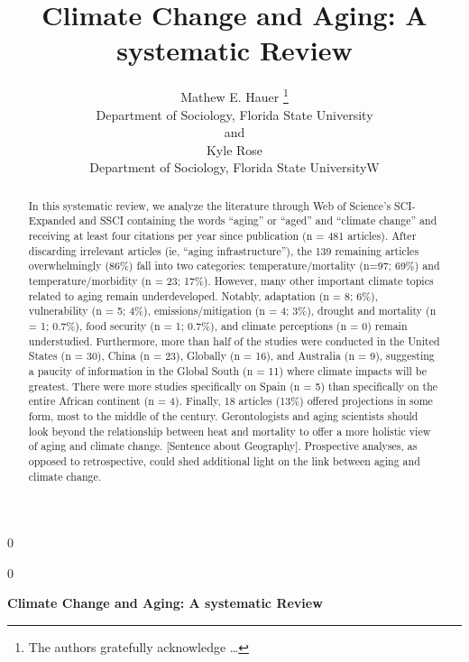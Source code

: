 \documentclass[12pt]{article}
\newcommand{\blind}{0}
\begin{document}
\def\spacingset#1{\renewcommand{\baselinestretch}%
{#1}\small\normalsize} \spacingset{1}



\blind
{
  \title{\bf Climate Change and Aging: A systematic Review}

  \author{
        Mathew E. Hauer \thanks{The authors gratefully acknowledge
\ldots{}} \\
    Department of Sociology, Florida State University\\
     and \\     Kyle Rose \\
    Department of Sociology, Florida State UniversityW\\
      }
  \maketitle
} \fi

\blind
{
  \bigskip
  \bigskip
  \bigskip
  \begin{center}
    {\LARGE\bf Climate Change and Aging: A systematic Review}
  \end{center}
  \medskip
} \fi

\bigskip
\begin{abstract}
In this systematic review, we analyze the literature through Web of
Science's SCI-Expanded and SSCI containing the words ``aging'' or
``aged'' and ``climate change'' and receiving at least four citations
per year since publication (n = 481 articles). After discarding
irrelevant articles (ie, ``aging infrastructure''), the 139 remaining
articles overwhelmingly (86\%) fall into two categories:
temperature/mortality (n=97; 69\%) and temperature/morbidity (n = 23;
17\%). However, many other important climate topics related to aging
remain underdeveloped. Notably, adaptation (n = 8; 6\%), vulnerability
(n = 5; 4\%), emissions/mitigation (n = 4; 3\%), drought and mortality
(n = 1; 0.7\%), food security (n = 1; 0.7\%), and climate perceptions (n
= 0) remain understudied. Furthermore, more than half of the studies
were conducted in the United States (n = 30), China (n = 23), Globally
(n = 16), and Australia (n = 9), suggesting a paucity of information in
the Global South (n = 11) where climate impacts will be greatest. There
were more studies specifically on Spain (n = 5) than specifically on the
entire African continent (n = 4). Finally, 18 articles (13\%) offered
projections in some form, most to the middle of the century.
Gerontologists and aging scientists should look beyond the relationship
between heat and mortality to offer a more holistic view of aging and
climate change. {[}Sentence about Geography{]}. Prospective analyses, as
opposed to retrospective, could shed additional light on the link
between aging and climate change.
\end{abstract}
\end{document}

